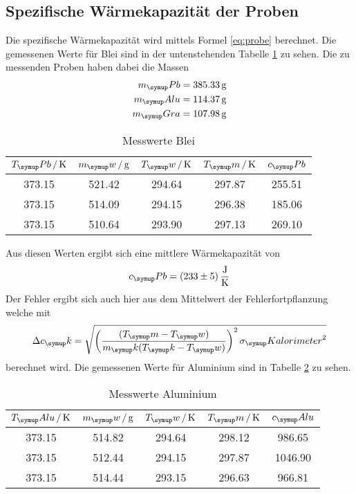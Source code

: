 \subsection{Spezifische Wärmekapazität der Proben}
Die spezifische Wärmekapazität wird mittels Formel \eqref{eq:probe} berechnet.
Die gemessenen Werte für Blei sind in der untenstehenden Tabelle \ref{tab:pb}
zu sehen.
Die zu messenden Proben haben dabei die Massen
\begin{align*}
m_\su{Pb} &= 385.33\gr \\
m_\su{Alu}&= 114.37\gr \\
m_\su{Gra}&= 107.98\gr
\end{align*}
\begin{table}
  \centering
  \begin{tabular}{c c c c c}
    \toprule
    $T_\su{Pb}\,/\Kel$ & $m_\su{w}\,/\gr$ & $T_\su{w}\,/\Kel
    $ & $T_\su{m}\,/\Kel$ & $c_\su{Pb}$\\
    \midrule
    373.15 & 521.42 & 294.64 & 297.87 & 255.51 \\
    373.15 & 514.09 & 294.15 & 296.38 & 185.06 \\
    373.15 & 510.64 & 293.90 & 297.13 & 269.10 \\
    \bottomrule
  \end{tabular}
  \caption{Messwerte Blei}
  \label{tab:pb}
\end{table}
Aus diesen Werten ergibt sich eine mittlere Wärmekapazität von
\begin{equation*}
  c_\su{Pb}=(233\pm5)\,\si{\joule\per\kelvin}
\end{equation*}
Der Fehler ergibt sich auch hier aus dem Mittelwert der Fehlerfortpflanzung
welche mit
\begin{equation}
  \Delta c_\su{k} = \sqrt{\left(\frac{(T_\su{m}-T_\su{w})}{m_\su{k}
  (T_\su{k}-T_\su{w})}\right)^2\sigma_\su{Kalorimeter}^2}
  \label{eq:gauss}
\end{equation}
berechnet wird.
Die gemessenen Werte für Aluminium sind in Tabelle \ref{tab:alu} zu sehen.
\begin{table}
  \centering
  \begin{tabular}{c c c c c}
    \toprule
    $T_\su{Alu}\,/\Kel$ & $m_\su{w}\,/\gr$ & $T_\su{w}\,/\Kel
    $ & $T_\su{m}\,/\Kel$ & $c_\su{Alu}$\\
    \midrule
    373.15 & 514.82 & 294.64 & 298.12 & 986.65\\
    373.15 & 512.44 & 294.15 & 297.87 &1046.90 \\
    373.15 & 514.44 & 293.15 & 296.63 & 966.81\\
    \bottomrule
  \end{tabular}
  \caption{Messwerte Aluminium}
  \label{tab:alu}
\end{table}

